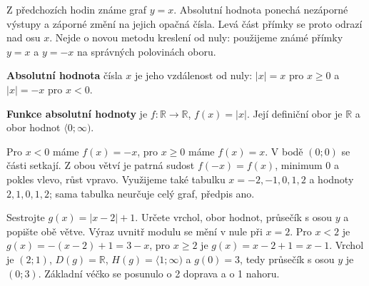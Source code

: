\documentclass[11pt,a4paper]{article}
\begin{document}
Z předchozích hodin známe graf $y=x$. Absolutní hodnota ponechá nezáporné výstupy a záporné změní na jejich opačná čísla. Levá část přímky se proto odrazí nad osu $x$. Nejde o novou metodu kreslení od nuly: použijeme známé přímky $y=x$ a $y=-x$ na správných polovinách oboru.
\begin{definiceBox}[title={Definice - Absolutní hodnota}]
\textbf{Absolutní hodnota} čísla $x$ je jeho vzdálenost od nuly: $|x|=x$ pro $x\ge0$ a $|x|=-x$ pro $x<0$.
\end{definiceBox}
\begin{definiceBox}[title={Definice - Funkce absolutní hodnoty}]
\textbf{Funkce absolutní hodnoty} je $f:\mathbb R\to\mathbb R$, $f(x)=|x|$. Její definiční obor je $\mathbb R$ a obor hodnot $\langle0;\infty)$.
\end{definiceBox}
Pro $x<0$ máme $f(x)=-x$, pro $x\ge0$ máme $f(x)=x$. V bodě $(0;0)$ se části setkají. Z obou větví je patrná sudost $f(-x)=f(x)$, minimum $0$ a pokles vlevo, růst vpravo. Využijeme také tabulku $x=-2,-1,0,1,2$ a hodnoty $2,1,0,1,2$; sama tabulka neurčuje celý graf, předpis ano.
\begin{center}
\end{center}
\begin{prikladReseniBox}[title={Příklad 1}]
Sestrojte $g(x)=|x-2|+1$. Určete vrchol, obor hodnot, průsečík s osou $y$ a popište obě větve.
\tcblower
Výraz uvnitř modulu se mění v nule při $x=2$. Pro $x<2$ je $g(x)=-(x-2)+1=3-x$, pro $x\ge2$ je $g(x)=x-2+1=x-1$. Vrchol je $(2;1)$, $D(g)=\mathbb R$, $H(g)=\langle1;\infty)$ a $g(0)=3$, tedy průsečík s osou $y$ je $(0;3)$. Základní véčko se posunulo o 2 doprava a o 1 nahoru.
\end{prikladReseniBox}
\end{document}
